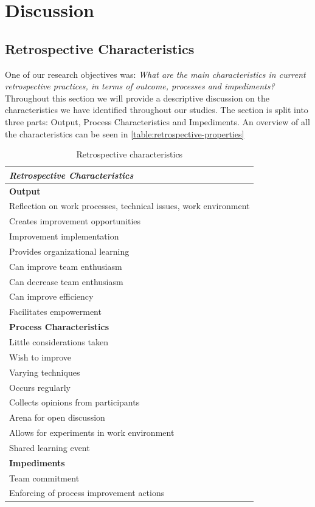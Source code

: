 \section{Discussion}

\subsection{Retrospective Characteristics}
One of our research objectives was: \textit{What are the main characteristics in current retrospective practices, in
terms of outcome, processes and impediments?} Throughout this section we will provide a descriptive discussion on the characteristics we have identified throughout our studies. The section is split into three parts: Output, Process Characteristics and Impediments. An overview of all the characteristics can be seen in \autoref{table:retrospective-properties}

\begin{table}[h]
	\begin{center}
		\caption{Retrospective characteristics}
		\label{table:retrospective-properties}
		\begin{tabular}{p{}}
			\hline
			\textit{Retrospective Characteristics}\\
			\hline
			\textbf{Output} \\
			Reflection on work processes, technical issues, work environment \\
			Creates improvement opportunities \\
			Improvement implementation \\
			Provides organizational learning \\
			Can improve team enthusiasm \\
			Can decrease team enthusiasm \\ 
			Can improve efficiency  \\
			Facilitates empowerment \\
			\hline 
			\textbf{Process Characteristics}\\
			Little considerations taken \\
			Wish to improve \\
			Varying techniques\\
			Occurs regularly\\
			Collects opinions from participants\\
			Arena for open discussion \\
			Allows for experiments in work environment\\
			Shared learning event\\
			\hline
			\textbf{Impediments}\\
			Team commitment\\
			Enforcing of process improvement actions\\
			\hline
		\end{tabular}
	\end{center}
\end{table}

